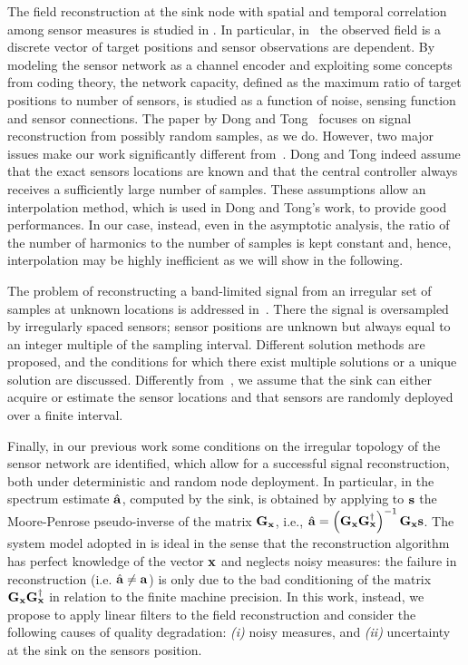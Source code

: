 \documentclass[final, a4paper]{IEEEtran}
\newcommand{\av}{{\bf a}}
\newcommand{\sv}{{\bf s}}
\newcommand{\xv}{{\bf x}}
\newcommand{\Gm}{{\bf G}}
\begin{document}
The field reconstruction at the sink node with spatial and
temporal correlation among sensor measures is studied in
\cite{CristescuVetterli,Poor,Vuran04,Rachlin1}.
In particular, in~\cite{Rachlin1} the observed field is a discrete vector of
target positions and sensor observations are dependent. By modeling
the sensor network as a channel encoder and exploiting some concepts
from coding theory, the network capacity,
defined as the maximum ratio of target positions to number of sensors,
is studied as a function of noise, sensing function and sensor connections.
The paper by Dong and Tong~\cite{DongTong} focuses on signal reconstruction from possibly random
samples, as we do. However, two major issues make our work significantly
different from~\cite{DongTong}. Dong and Tong indeed assume that the exact
sensors locations are  known and that the central controller
always receives a sufficiently large number of samples. These assumptions allow
an interpolation method, which is used in  Dong and Tong's work,
to provide good performances. In our case, instead, even
in the asymptotic analysis, the ratio of the number of harmonics
to the number of samples is kept constant and, hence, interpolation
may be highly inefficient as we will show in the following.


The problem of reconstructing a band-limited signal from an
irregular set of samples at unknown locations is addressed
in~\cite{Marziliano00}. There the signal is oversampled by
irregularly spaced sensors; sensor positions are unknown but always
equal to an integer multiple of the sampling interval. Different
solution methods are proposed, and the conditions for which there
exist multiple solutions or a unique solution are discussed.
Differently from~\cite{Marziliano00}, we assume that the sink can
either acquire or estimate the sensor locations and that sensors are
randomly deployed over a finite interval.

Finally, in our previous work \cite{NordioChiasseriniViterbo} some conditions
on the irregular topology of the sensor network are identified, which allow for
a successful signal reconstruction, both under deterministic and random
node deployment. In particular, in \cite{NordioChiasseriniViterbo} the
spectrum estimate $\hat{\av}$,
computed by the sink, is obtained by applying to $\sv$ the
Moore-Penrose pseudo-inverse of the matrix $\Gm_\xv$, i.e.,
$\hat{\av} = \left(\Gm_\xv\Gm_\xv^\dagger \right)^{-1}\Gm_\xv\sv$.
The system model adopted in \cite{NordioChiasseriniViterbo} is ideal in the sense that
the reconstruction algorithm has perfect knowledge of the vector $\xv$ and
neglects noisy measures: the failure in reconstruction (i.e. $\hat{\av}\neq \av$)
is only due to the bad conditioning of the matrix $\Gm_\xv\Gm_\xv\Herm$ in relation to the
finite machine precision.
In this work, instead, we propose to apply linear filters to the field reconstruction
and consider the following causes of quality degradation: {\em (i)}
noisy measures, and {\em (ii)} uncertainty at the sink on the sensors position.
\end{document}
